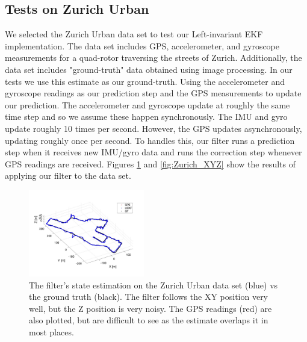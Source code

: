 \subsection{Tests on Zurich Urban}
We selected the Zurich Urban data set \cite{majdik2017zurich} to test our Left-invariant EKF implementation. The data set includes GPS, accelerometer, and gyroscope measurements for a quad-rotor traversing the streets of Zurich. Additionally, the data set includes "ground-truth" data obtained using image processing. In our tests we use this estimate as our ground-truth. Using the accelerometer and gyroscope readings as our prediction step and the GPS measurements to update our prediction. The accelerometer and gyroscope update at roughly the same time step and so we assume these happen synchronously. The IMU and gyro update roughly 10 times per second. However, the GPS updates asynchronously, updating roughly once per second. To handles this, our filter runs a prediction step when it receives new IMU/gyro data and runs the correction step whenever GPS readings are received. Figures \ref{fig:Zurich_3D} and \ref{fig:Zurich_XYZ} show the results of applying our filter to the data set.

\begin{figure}
    \centering
    \includegraphics[width=0.45\textwidth]{sections/figures/Zurich_3D.jpg}
    \caption{The filter's state estimation on the Zurich Urban data set (blue) vs the ground truth (black). The filter follows the XY position very well, but the Z position is very noisy. The GPS readings (red) are also plotted, but are difficult to see as the estimate overlaps it in most places.}
    \label{fig:Zurich_3D}
\end{figure}

